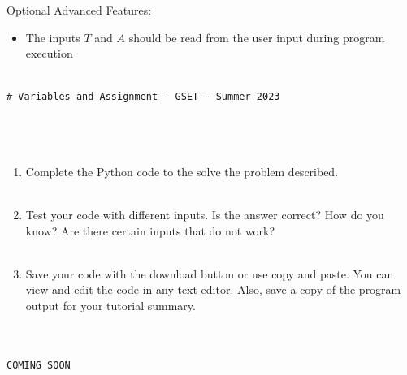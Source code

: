 \documentclass[12pt]{article}
\begin{document}
\begin{description}[labelindent=1cm]
	Optional Advanced Features:
\begin{itemize}
	\item The inputs $T$ and $A$ should be read from the user input during program execution
		
    
\end{itemize}	
\newpage

\item[\textbf{\underline{Example Code:}}] \hfill \vspace{0mm}

	\begin{lstlisting}

# Variables and Assignment - GSET - Summer 2023 
	

	
	\end{lstlisting}
		


	\item[\textbf{\underline{Part 3 - Testing:}}] \hfill \vspace{0mm}
	\begin{enumerate}
	
		\item Complete the Python code to the solve the problem described. \\\\
		
		\item Test your code with different inputs. Is the answer correct? How do you know? Are there certain inputs that do not work? \\\\
		
		\item Save your code with the download button or use copy and paste. You can view and edit the code in any text editor. Also, save a copy of the program output for your tutorial summary. \\\\

	\end{enumerate}

\newpage
\item[\textbf{\underline{Solution Code:}}] \hfill \vspace{0mm}

\begin{lstlisting}

COMING SOON
	

\end{lstlisting}
\end{description}
\end{document}
